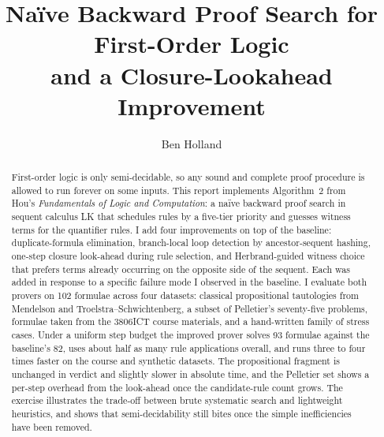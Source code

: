 \documentclass[runningheads]{llncs}
\begin{document}
\title{Naïve Backward Proof Search for First-Order Logic\\
       and a Closure-Lookahead Improvement}


\author{Ben Holland}

\maketitle

\begin{abstract}

First-order logic is only semi-decidable, so any sound and complete
proof procedure is allowed to run forever on some inputs. This report
implements Algorithm~2 from Hou's \textit{Fundamentals of Logic and
Computation}: a naïve backward proof search in sequent calculus LK
that schedules rules by a five-tier priority and guesses witness terms
for the quantifier rules. I add four improvements on top of the
baseline: duplicate-formula elimination, branch-local loop detection by
ancestor-sequent hashing, one-step closure look-ahead during rule
selection, and Herbrand-guided witness choice that prefers terms
already occurring on the opposite side of the sequent. Each was added
in response to a specific failure mode I observed in the baseline.
I evaluate both provers on 102 formulae across four datasets: classical
propositional tautologies from Mendelson and
Troelstra--Schwichtenberg, a subset of Pelletier's seventy-five
problems, formulae taken from the 3806ICT course materials, and a
hand-written family of stress cases. Under a uniform step budget the
improved prover solves 93 formulae against the baseline's 82, uses
about half as many rule applications overall, and runs three to four
times faster on the course and synthetic datasets. The propositional
fragment is unchanged in verdict and slightly slower in absolute time,
and the Pelletier set shows a per-step overhead from the look-ahead
once the candidate-rule count grows. The exercise illustrates the
trade-off between brute systematic search and lightweight heuristics,
and shows that semi-decidability still bites once the simple
inefficiencies have been removed.

\end{abstract}
\end{document}

